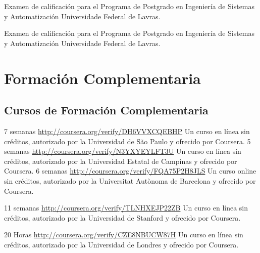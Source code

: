\documentclass[11pt,a4paper,sans]{moderncv} %
\begin{document}
			{}
			{Examen de calificación para el Programa de Postgrado en Ingeniería de Sistemas y Automatización}{}
			{Universidade Federal de Lavras.}

			{}
			{Examen de calificación para el Programa de Postgrado en Ingeniería de Sistemas y Automatización}{}
			{Universidade Federal de Lavras.}
\section{Formación Complementaria}

\subsection{ Cursos de Formación Complementaria }
	      {7 semanas}
	      {\url{http://coursera.org/verify/DH6VVXCQEBHP}}{}
	      {Un curso en línea sin créditos, autorizado por la Universidad de São Paulo y ofrecido por Coursera.}
	      {5 semanas}
	      {\url{http://coursera.org/verify/N3YXYEYLFT3U}}{}
	      {Un curso en línea sin créditos, autorizado por la Universidad Estatal de Campinas y ofrecido por Coursera.}
	      {6 semanas}
	      {\url{http://coursera.org/verify/FQA75P2H8JLS}}{}
	      {Un curso online sin créditos, autorizado por la Universitat Autònoma de Barcelona y ofrecido por Coursera.}

	      {11 semanas}
	      {\url{http://coursera.org/verify/TLNHXEJP22ZB}}{}
	      {Un curso en línea sin créditos, autorizado por la Universidad de Stanford y ofrecido por Coursera.}

	      {20 Horas}
	      {\url{http://coursera.org/verify/CZE8NBUCW87H}}{}
	      {Un curso en línea sin créditos, autorizado por la Universidad de Londres y ofrecido por Coursera.}

\end{document}
